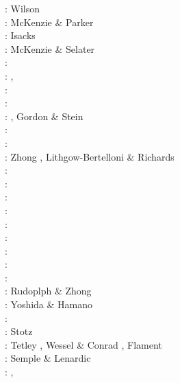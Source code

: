 \nineteensixtysix: Wilson \cite{wils66}\\
\nineteensixtyseven: McKenzie \& Parker \cite{mcpa67}\\
\nineteensixtyeight: Isacks \etal \cite{isos68} \\ 
\nineteenseventythree: McKenzie \& Selater \cite{mcse73}\\
\nineteenseventyfour: \cite{sosl74}\\
\nineteenseventyfive: \cite{harp75}, \cite{turc75}\\
\nineteenninety: \cite{dega90}\\
\nineteenninetyone: \cite{virf91}\\
\nineteenninetytwo: \cite{zieg92a}, Gordon \& Stein \cite{gost92}\\
\nineteenninetyfour: \cite{guto94}\\
\nineteenninetyseven: \cite{wean97b}\\
\nineteenninetyeight: Zhong \etal \cite{zhgm98}, Lithgow-Bertelloni \& Richards \cite{liri98}\\
\nineteenninetynine: \cite{ribr99}\\
\twothousandone: \cite{yohk01}\\
\twothousandtwo: \cite{stoc02}\\
\twothousandthree: \cite{evan03}\cite{reta03}\\
\twothousandseven: \cite{zhzl07}\\
\twothousandnine: \cite{lizh09}\cite{vasv09}\cite{iabu09}\cite{scbs09}\\
\twothousandten: \cite{stto10}\cite{dega10}\\
\twothousandtwelve: \cite{huss12}\cite{gutz12}\cite{qumm12}\cite{holr12}\cite{dost12}\cite{shbs12}\\
\twothousandthirteen: \cite{mosq13}\cite{cost13}\\
\twothousandfourteen: Rudoplph \& Zhong \cite{ruzh14} \\
\twothousandfifteen: Yoshida \& Hamano \cite{yoha15}\\
\twothousandsixteen: \cite{pric16}\\
\twothousandseventeen: Stotz \etal \cite{stid17}\\
\twothousandnineteen: Tetley \etal \cite{tewg19}, Wessel \& Conrad \cite{weco19}, 
                      Flament \cite{flam19}\\
\twothousandtwenty: Semple \& Lenardic \cite{sele20}\\
\twothousandtwentyone: 
,



